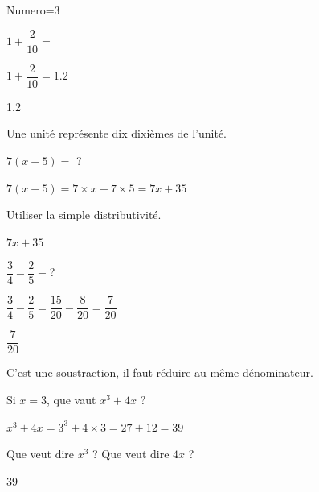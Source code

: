 \documentclass[12pt,french]{article}
\begin{document}
\begin{Maquette}[DS,CorrigeFin]{Numero=3}
  \begin{exercice} %
    $1+\dfrac2{10}=$
  \end{exercice}
  \begin{Solution}
    $1+\dfrac2{10}=\num{1.2}$
  \end{Solution}
  \begin{Reponse}
    \num{1.2}
  \end{Reponse}
  \begin{Indice}
    Une unité représente dix dixièmes de l'unité.
  \end{Indice}
  \begin{exercice}[PasCorrige]
    $7(x+5)=$ ?
  \end{exercice}
  \begin{Solution}
    $7(x+5)=7\times x+7\times 5=7x+35$
  \end{Solution}
  \begin{Indice}
    Utiliser la simple distributivité.
  \end{Indice}
  \begin{Reponse}
    $7x+35$
  \end{Reponse}
  \begin{exercice}[Direct]
    
    $\dfrac34-\dfrac25=$?
  \end{exercice}
  \begin{Solution}
    $\dfrac34-\dfrac25=\dfrac{15}{20}-\dfrac8{20}=\dfrac7{20}$
  \end{Solution}
  \begin{Reponse}
    $\dfrac7{20}$
  \end{Reponse}
  \begin{Indice}
    C'est une soustraction, il faut réduire au même dénominateur.
  \end{Indice}
  \begin{exercice}[Pouce]
    Si $x=3$, que vaut $x^3+4x$ ?
  \end{exercice}
  \begin{Solution}
    $x^3+4x=3^3+4\times3=27+12=39$
  \end{Solution}
  \begin{Indice}
    Que veut dire $x^3$ ? Que veut dire $4x$ ?
  \end{Indice}
  \begin{Reponse}
    39
  \end{Reponse}
\end{Maquette}
\end{document}

